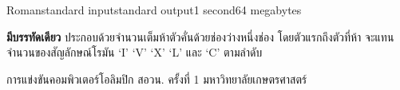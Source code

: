 \documentclass[11pt,a4paper]{article}
\begin{document}
\begin{problem}{Roman}{standard input}{standard output}{1 second}{64 megabytes}
\OutputFile

\textbf{มีบรรทัดเดียว} ประกอบด้วยจำนวนเต็มห้าตัวคั่นด้วยช่องว่างหนึ่งช่อง โดยตัวแรกถึงตัวที่ห้า จะแทนจำนวนของสัญลักษณ์โรมัน ‘I’ ‘V’ ‘X’ ‘L’ และ ‘C’ ตามลำดับ

\Examples

\begin{example}
%
\end{example}

\Source

การแข่งขันคอมพิวเตอร์โอลิมปิก สอวน. ครั้งที่ 1 มหาวิทยาลัยเกษตรศาสตร์

\end{problem}
\end{document}

